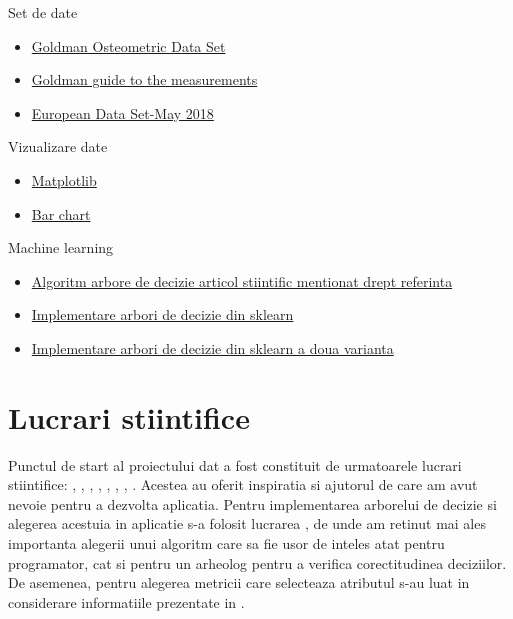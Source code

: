 \documentclass[runningheads,a4paper,11pt]{report}
\begin{document}
\noindent Set de date
\begin{itemize}
    \item \href{https://web.utk.edu/~auerbach/GOLD.htm}{Goldman Osteometric Data Set}
    \item \href{https://web.utk.edu/~auerbach/GoldMeasures.pdf}{Goldman guide to the measurements}
    \item \href{https://fae.johnshopkins.edu/}{European Data Set-May 2018}
\end{itemize}

\noindent Vizualizare date
\begin{itemize}
    \item \href{https://matplotlib.org/stable/tutorials/introductory/pyplot.html}{Matplotlib}
    \item \href{https://pythonbasics.org/matplotlib-bar-chart/}{Bar chart}
\end{itemize}

\noindent Machine learning
\begin{itemize}
    \item \href{https://en.wikipedia.org/wiki/ID3_algorithm}{Algoritm arbore de decizie articol stiintific mentionat drept referinta}
    \item \href{https://machinelearningmastery.com/classification-and-regression-trees-for-machine-learning/}{Implementare arbori de decizie din sklearn}
    \item \href{https://www.datacamp.com/community/tutorials/decision-tree-classification-python}{Implementare arbori de decizie din sklearn a doua varianta}
\end{itemize}

\chapter{Lucrari stiintifice}
\label{chapter:lucrariStiintifice}

Punctul de start al proiectului dat a fost constituit de urmatoarele lucrari stiintifice: \cite{doc1}, \cite{doc2}, \cite{doc3}, \cite{doc4}, \cite{doc5}, \cite{doc6}, \cite{doc7}, \cite{doc8}. Acestea au oferit inspiratia si ajutorul de care am avut nevoie pentru a dezvolta aplicatia. \newline \newline
Pentru implementarea arborelui de decizie si alegerea acestuia in aplicatie s-a folosit lucrarea  \cite{doc7}, de unde am retinut mai ales importanta alegerii unui algoritm care sa fie usor de inteles atat pentru programator, cat si pentru un arheolog pentru a verifica corectitudinea deciziilor. De asemenea, pentru alegerea metricii care selecteaza atributul s-au luat in considerare informatiile prezentate in \cite{doc6}.



\end{document}

